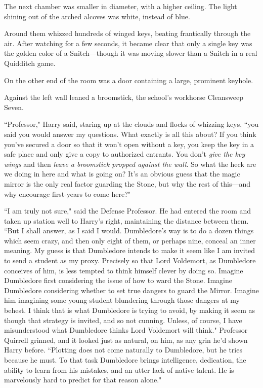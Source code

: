\later

The next chamber was smaller in diameter, with a higher ceiling. The light shining out of the arched alcoves was white, instead of blue.

Around them whizzed hundreds of winged keys, beating frantically through the air. After watching for a few seconds, it became clear that only a single key was the golden color of a Snitch---though it was moving slower than a Snitch in a real Quidditch game.

On the other end of the room was a door containing a large, prominent keyhole.

Against the left wall leaned a broomstick, the school's workhorse Cleansweep Seven.

``Professor," Harry said, staring up at the clouds and flocks of whizzing keys, ``you said you would answer my questions. What exactly is all this about? If you think you've secured a door so that it won't open without a key, you keep the key in a safe place and only give a copy to authorized entrants. You don't \emph{give the key wings} and then \emph{leave a broomstick propped against the wall}. So what the heck are we doing in here and what is going on? It's an obvious guess that the magic mirror is the only real factor guarding the Stone, but why the rest of this---and why encourage first-years to come here?"

``I am truly not sure," said the Defense Professor. He had entered the room and taken up station well to Harry's right, maintaining the distance between them. ``But I shall answer, as I said I would. Dumbledore's way is to do a dozen things which seem crazy, and then only eight of them, or perhaps nine, conceal an inner meaning. My guess is that Dumbledore intends to make it seem like I am invited to send a student as my proxy. Precisely so that Lord Voldemort, as Dumbledore conceives of him, is less tempted to think himself clever by doing so. Imagine Dumbledore first considering the issue of how to ward the Stone. Imagine Dumbledore considering whether to set true dangers to guard the Mirror. Imagine him imagining some young student blundering through those dangers at my behest. I think that is what Dumbledore is trying to avoid, by making it seem as though that strategy is invited, and so not cunning. Unless, of course, I have misunderstood what Dumbledore thinks Lord Voldemort will think." Professor Quirrell grinned, and it looked just as natural, on him, as any grin he'd shown Harry before. ``Plotting does not come naturally to Dumbledore, but he tries because he must. To that task Dumbledore brings intelligence, dedication, the ability to learn from his mistakes, and an utter lack of native talent. He is marvelously hard to predict for that reason alone."

